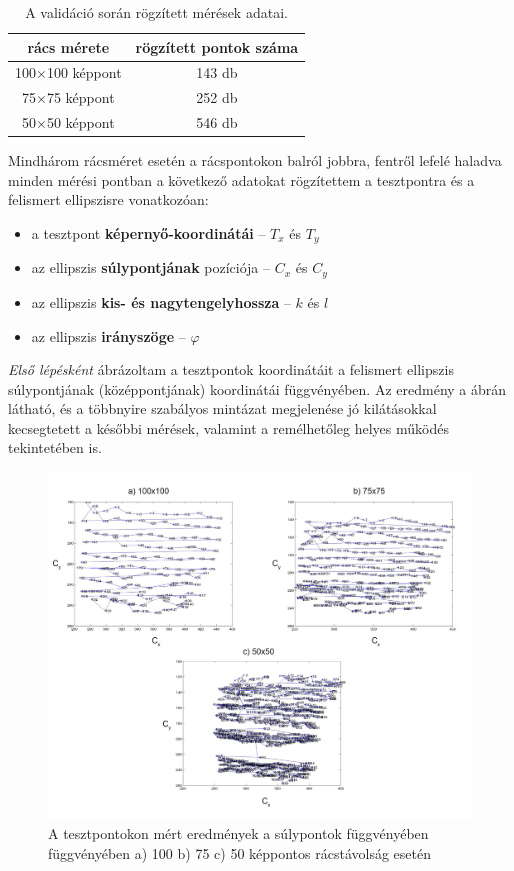 \begin{table}[ht]
	\centering
	\caption{A validáció során rögzített mérések adatai.} \label{tab:meresi_pontok}
	\begin{tabular}{ c | c }
	rács mérete & rögzített pontok száma \\ \hline \hline
	100$\times$100 képpont & 143 db \\
	75$\times$75 képpont & 252 db \\
	50$\times$50 képpont & 546 db \\
	\end{tabular}
\end{table}

Mindhárom rácsméret esetén a rácspontokon balról jobbra, fentről lefelé haladva minden mérési pontban a következő adatokat rögzítettem a tesztpontra és a felismert ellipszisre vonatkozóan:

\begin{itemize}
  \item a tesztpont \textbf{képernyő-koordinátái} -- $T_x$ és $T_y$
  \item az ellipszis \textbf{súlypontjának} pozíciója -- $C_x$ és $C_y$
  \item az ellipszis \textbf{kis- és nagytengelyhossza} -- $k$ és $l$
  \item az ellipszis \textbf{irányszöge} -- $\varphi$
\end{itemize}

\emph{Első lépésként} ábrázoltam a tesztpontok koordinátáit a felismert ellipszis súlypontjának (középpontjának)  koordinátái függvényében. Az eredmény a  ábrán látható, és a többnyire szabályos mintázat megjelenése jó kilátásokkal kecsegtetett a későbbi mérések, valamint a remélhetőleg helyes működés tekintetében is.

\begin{figure}[!ht]
\centering
\includegraphics[width=150mm, keepaspectratio]{figures/calib_coords.png}
\caption{A tesztpontokon mért eredmények a súlypontok függvényében függvényében a) 100 b) 75 c) 50 képpontos rácstávolság esetén}
\label{fig:calib_coords}
\end{figure}

